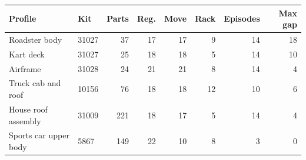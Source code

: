 \begin{tabular}{llrrrrrr}\toprule
Profile & Kit & Parts & Reg. & Move & Rack & Episodes & Max gap\\\midrule
Roadster body & 31027 & 37 & 17 & 17 & 9 & 14 & 18\\
Kart deck & 31027 & 25 & 18 & 18 & 5 & 14 & 10\\
Airframe & 31028 & 24 & 21 & 21 & 8 & 14 & 4\\
Truck cab and roof & 10156 & 76 & 18 & 18 & 12 & 10 & 6\\
House roof assembly & 31009 & 221 & 18 & 17 & 5 & 14 & 4\\
Sports car upper body & 5867 & 149 & 22 & 10 & 8 & 3 & 0\\
\bottomrule\end{tabular}
